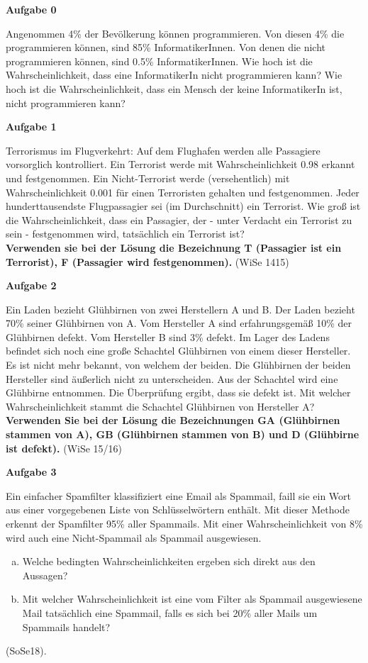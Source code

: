 \documentclass[a4paper,12pt]{article}
\newcommand{\Aufgabe}[1]{
  {
  \vspace*{0.5cm}
  \textsf{\textbf{Aufgabe #1}}
  \vspace*{0.2cm}
  
  }
}
\begin{document}
\Aufgabe{0}
Angenommen 4\% der Bevölkerung können programmieren. Von diesen 4\% die programmieren können, sind 85\% InformatikerInnen. Von denen die nicht programmieren können, sind 0.5\% InformatikerInnen. Wie hoch ist die Wahrscheinlichkeit, dass eine InformatikerIn nicht programmieren kann? Wie hoch ist die Wahrscheinlichkeit, dass ein Mensch der keine InformatikerIn ist, nicht programmieren kann?

\Aufgabe{1}
Terrorismus im Flugverkehrt: Auf dem Flughafen werden alle Passagiere vorsorglich kontrolliert. Ein Terrorist werde mit Wahrscheinlichkeit 0.98 erkannt und festgenommen. Ein Nicht-Terrorist werde (versehentlich) mit Wahrscheinlichkeit 0.001 für einen Terroristen gehalten und festgenommen. Jeder hunderttausendste Flugpassagier sei (im Durchschnitt) ein Terrorist. 
Wie groß ist die Wahrscheinlichkeit, dass ein Passagier, der - unter Verdacht ein Terrorist zu sein - festgenommen wird, tatsächlich ein Terrorist ist? \\
\textbf{
Verwenden sie bei der Lösung die Bezeichnung T (Passagier ist ein Terrorist), F (Passagier wird festgenommen). 
}
(WiSe 1415)

\Aufgabe{2} 
Ein Laden bezieht Glühbirnen von zwei Herstellern A und B. Der Laden bezieht 70\% seiner Glühbirnen von A. Vom Hersteller A sind erfahrungsgemäß 10\% der Glühbirnen defekt. Vom Hersteller B sind 3\% defekt. Im Lager des Ladens befindet sich noch eine große Schachtel Glühbirnen von einem dieser Hersteller. Es ist nicht mehr bekannt, von welchem der beiden. Die Glühbirnen der beiden Hersteller sind äußerlich nicht zu unterscheiden. Aus der Schachtel wird eine Glühbirne entnommen. Die Überprüfung ergibt, dass sie defekt ist. Mit welcher Wahrscheinlichkeit stammt die Schachtel Glühbirnen von Hersteller A? \\
\textbf{
Verwenden Sie bei der Lösung die Bezeichnungen GA (Glühbirnen stammen von A), GB (Glühbirnen stammen von B) und D (Glühbirne ist defekt).
}
(WiSe 15/16)

\Aufgabe{3}
Ein einfacher Spamfilter klassifiziert eine Email als Spammail, faill sie ein Wort aus einer vorgegebenen Liste von Schlüsselwörtern enthält. Mit dieser Methode erkennt der Spamfilter 95\% aller Spammails. Mit einer Wahrscheinlichkeit von 8\% wird auch eine Nicht-Spammail als Spammail ausgewiesen.
\begin{enumerate}[a)]
\item Welche bedingten Wahrscheinlichkeiten ergeben sich direkt aus den Aussagen?
\item Mit welcher Wahrscheinlichkeit ist eine vom Filter als Spammail ausgewiesene Mail tatsächlich eine Spammail, falls es sich bei 20\% aller Mails um Spammails handelt?
\end{enumerate}
 (SoSe18).
 
\end{document}
